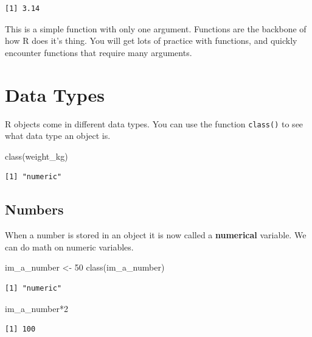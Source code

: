 \documentclass[
  letterpaper,
  DIV=11,
  numbers=noendperiod,
  oneside]{scrreprt}
\newenvironment{Shaded}{\begin{snugshade}}{\end{snugshade}}
\newcommand{\DecValTok}[1]{\textcolor[rgb]{0.68,0.00,0.00}{#1}}
\newcommand{\FunctionTok}[1]{\textcolor[rgb]{0.28,0.35,0.67}{#1}}
\newcommand{\NormalTok}[1]{\textcolor[rgb]{0.00,0.23,0.31}{#1}}
\newcommand{\OtherTok}[1]{\textcolor[rgb]{0.00,0.23,0.31}{#1}}
\newcommand{\SpecialCharTok}[1]{\textcolor[rgb]{0.37,0.37,0.37}{#1}}
\begin{document}
\begin{verbatim}
[1] 3.14
\end{verbatim}

This is a simple function with only one argument. Functions are the
backbone of how R does it's thing. You will get lots of practice with
functions, and quickly encounter functions that require many arguments.

\section{Data Types}\label{data-types}

R objects come in different data types. You can use the function
\texttt{class()} to see what data type an object is.

\begin{Shaded}
\begin{Highlighting}[]
\FunctionTok{class}\NormalTok{(weight\_kg)}
\end{Highlighting}
\end{Shaded}

\begin{verbatim}
[1] "numeric"
\end{verbatim}

\subsection{Numbers}\label{numbers}

When a number is stored in an object it is now called a
\textbf{numerical} variable. We can do math on numeric variables.

\begin{Shaded}
\begin{Highlighting}[]
\NormalTok{im\_a\_number }\OtherTok{\textless{}{-}} \DecValTok{50}
\FunctionTok{class}\NormalTok{(im\_a\_number)}
\end{Highlighting}
\end{Shaded}

\begin{verbatim}
[1] "numeric"
\end{verbatim}

\begin{Shaded}
\begin{Highlighting}[]
\NormalTok{im\_a\_number}\SpecialCharTok{*}\DecValTok{2}
\end{Highlighting}
\end{Shaded}

\begin{verbatim}
[1] 100
\end{verbatim}
\end{document}
